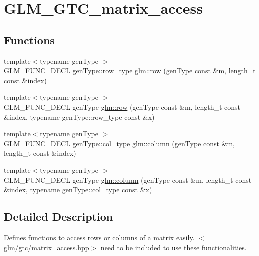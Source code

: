 \hypertarget{group__gtc__matrix__access}{}\section{G\+L\+M\+\_\+\+G\+T\+C\+\_\+matrix\+\_\+access}
\label{group__gtc__matrix__access}
\subsection*{Functions}
\begin{DoxyCompactItemize}
\item 
{\footnotesize template$<$typename gen\+Type $>$ }\\G\+L\+M\+\_\+\+F\+U\+N\+C\+\_\+\+D\+E\+CL gen\+Type\+::row\+\_\+type \hyperlink{group__gtc__matrix__access_ga5b874831eef18913dbe30153e52a2476}{glm\+::row} (gen\+Type const \&m, length\+\_\+t const \&index)
\item 
{\footnotesize template$<$typename gen\+Type $>$ }\\G\+L\+M\+\_\+\+F\+U\+N\+C\+\_\+\+D\+E\+CL gen\+Type \hyperlink{group__gtc__matrix__access_gacb34e8dca9cd0efdd247a65e36ed0a86}{glm\+::row} (gen\+Type const \&m, length\+\_\+t const \&index, typename gen\+Type\+::row\+\_\+type const \&x)
\item 
{\footnotesize template$<$typename gen\+Type $>$ }\\G\+L\+M\+\_\+\+F\+U\+N\+C\+\_\+\+D\+E\+CL gen\+Type\+::col\+\_\+type \hyperlink{group__gtc__matrix__access_ga5c37fbeb062151f930e8a231c37e6b81}{glm\+::column} (gen\+Type const \&m, length\+\_\+t const \&index)
\item 
{\footnotesize template$<$typename gen\+Type $>$ }\\G\+L\+M\+\_\+\+F\+U\+N\+C\+\_\+\+D\+E\+CL gen\+Type \hyperlink{group__gtc__matrix__access_gaff0c6f887deb04ce0519084d32aadb85}{glm\+::column} (gen\+Type const \&m, length\+\_\+t const \&index, typename gen\+Type\+::col\+\_\+type const \&x)
\end{DoxyCompactItemize}


\subsection{Detailed Description}
Defines functions to access rows or columns of a matrix easily. $<$\hyperlink{matrix__access_8hpp}{glm/gtc/matrix\+\_\+access.\+hpp}$>$ need to be included to use these functionalities. 

